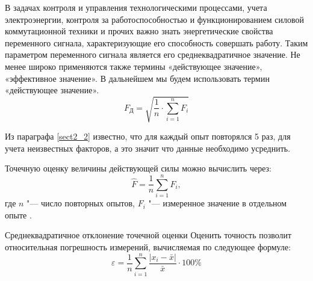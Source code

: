 В задачах контроля и управления технологическими процессами, учета электроэнергии, контроля за работоспособностью и функционированием силовой коммутационной техники и прочих важно знать энергетические свойства переменного сигнала, характеризующие  его способность совершать работу. Таким параметром переменного сигнала является  его среднеквадратичное значение. Не менее широко применяются также термины «действующее значение», «эффективное значение». В дальнейшем мы будем использовать термин «действующее значение».
\begin{equation}\label{eq:rms}
F_\text{Д}=\sqrt{\frac{1}{n}\cdot\sum_{i=1}^{n} F_i}
\end{equation}


Из параграфа \ref{sect2_2} известно, что для каждый опыт повторялся 5 раз, для учета неизвестных факторов, а это значит что данные необходимо усреднить.

Точечную оценку величины действующей силы можно вычислить через:
\begin{equation}\label{eq:x_ocenka}
\hat{F}=\frac{1}{n}\sum_{i=1}^{n} F_i,
\end{equation}
где $ n $ "--- число повторных опытов, $ F_i $ "--- измеренное значение в отдельном опыте \cite{Zajigaev}.

Среднеквадратичное отклонение точечной оценки 
Оценить точность позволит относительная погрешность измерений, вычисляемая по следующее формуле:
\begin{equation}\label{eq:Error}
\varepsilon=\frac{1}{n}\sum_{i=1}^{n} \frac{\left| x_i-\bar{x}\right| }{\bar{x}}\cdot100\%
\end{equation}